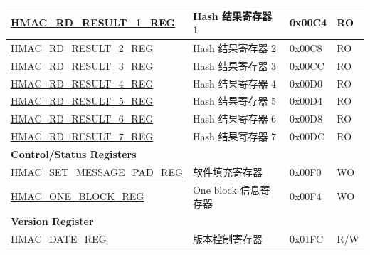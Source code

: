 \begin{longtable}{ | p{6cm} | p{7.2cm} | p{1.3cm} | p{1cm} | }
\hyperref[regdesc:HMACRDRESULTNREG]{HMAC\_RD\_RESULT\_1\_REG} & Hash 结果寄存器 1 & 0x00C4 & RO \\ \hline
\hyperref[regdesc:HMACRDRESULTNREG]{HMAC\_RD\_RESULT\_2\_REG} & Hash 结果寄存器 2 & 0x00C8 & RO \\ \hline
\hyperref[regdesc:HMACRDRESULTNREG]{HMAC\_RD\_RESULT\_3\_REG} & Hash 结果寄存器 3 & 0x00CC & RO \\ \hline
\hyperref[regdesc:HMACRDRESULTNREG]{HMAC\_RD\_RESULT\_4\_REG} & Hash 结果寄存器 4 & 0x00D0 & RO \\ \hline
\hyperref[regdesc:HMACRDRESULTNREG]{HMAC\_RD\_RESULT\_5\_REG} & Hash 结果寄存器 5 & 0x00D4 & RO \\ \hline
\hyperref[regdesc:HMACRDRESULTNREG]{HMAC\_RD\_RESULT\_6\_REG} & Hash 结果寄存器 6 & 0x00D8 & RO \\ \hline
\hyperref[regdesc:HMACRDRESULTNREG]{HMAC\_RD\_RESULT\_7\_REG} & Hash 结果寄存器 7 & 0x00DC & RO \\ \hline
\multicolumn{4}{|l|}{\textbf{Control/Status Registers}} \\ \hline
\hyperref[regdesc:HMACSETMESSAGEPADREG]{HMAC\_SET\_MESSAGE\_PAD\_REG} & 软件填充寄存器 & 0x00F0 & WO \\ \hline
\hyperref[regdesc:HMACONEBLOCKREG]{HMAC\_ONE\_BLOCK\_REG} & One block 信息寄存器 & 0x00F4 & WO \\ \hline
\multicolumn{4}{|l|}{\textbf{Version Register}} \\ \hline
\hyperref[regdesc:HMACDATEREG]{HMAC\_DATE\_REG} & 版本控制寄存器 & 0x01FC & R/W \\ \hline
\end{longtable}
